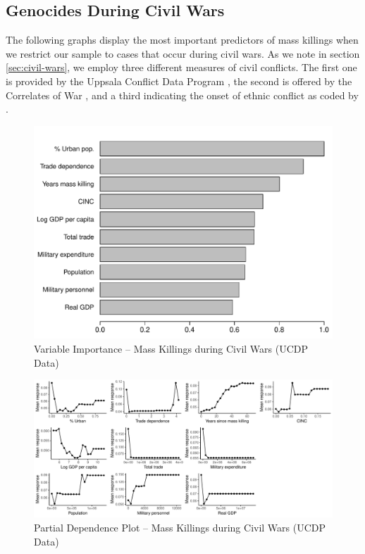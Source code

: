 \documentclass[a4paper,12pt]{article}
\begin{document}
\subsection{Genocides During Civil Wars}

The following graphs display the most important predictors of mass killings when we restrict our sample to cases that occur during civil wars. As we note in section \ref{sec:civil-wars}, we employ three different measures of civil conflicts. The first one is provided by the Uppsala Conflict Data Program \citep{allansson2017organized,gleditsch2002armed}, the second is offered by the Correlates of War \citep{sarkees2010resort}, and a third indicating the onset of ethnic conflict as coded by \citet{cederman2010ethnic}.  

\begin{figure}[H]
    \centering
    \includegraphics{images/rf-ucdp.pdf}
    \caption{Variable Importance -- Mass Killings during Civil Wars (UCDP Data)}
    \label{fig:rf-mk-ucdp}
\end{figure}

\newpage 

\begin{figure}[H]
    \centering
    \includegraphics[width=.98\textheight,angle=90]{images/rf-ucdp-pd.pdf}
    \caption{Partial Dependence Plot -- Mass Killings during Civil Wars (UCDP Data)}
    \label{fig:rf-mk-ucdp-pd}
\end{figure}
\end{document}
